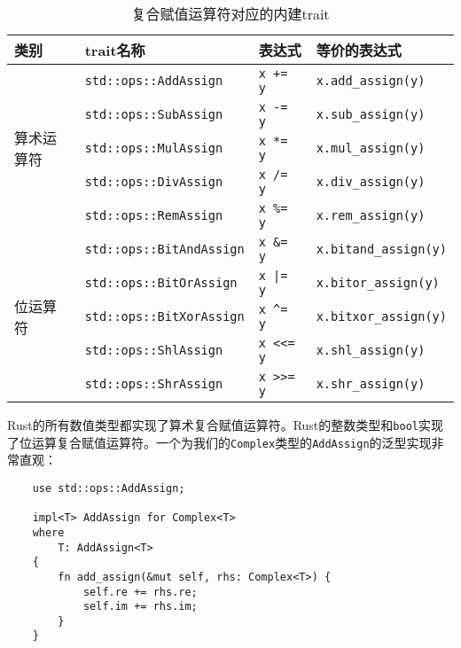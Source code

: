 \begin{table}[htbp]
    \centering
    \caption{复合赋值运算符对应的内建trait}
    \label{t12-4}
    \begin{tabular}{llll}
        \hline
        \textbf{类别}   & \textbf{trait名称}    & \textbf{表达式}   & \textbf{等价的表达式} \\
        \hline

        \multirow{5}{*}{算术运算符} & \texttt{std::ops::AddAssign}    & \texttt{x += y}    & \texttt{x.add\_assign(y)} \\
        & \texttt{std::ops::SubAssign} \cellcolor{tablecolor} & \texttt{x -= y} \cellcolor{tablecolor} & \texttt{x.sub\_assign(y)} \cellcolor{tablecolor}  \\
        & \texttt{std::ops::MulAssign}    & \texttt{x *= y}    & \texttt{x.mul\_assign(y)} \\
        & \texttt{std::ops::DivAssign} \cellcolor{tablecolor} & \texttt{x /= y} \cellcolor{tablecolor} & \texttt{x.div\_assign(y)} \cellcolor{tablecolor}  \\
        & \texttt{std::ops::RemAssign}    & \texttt{x \%= y}   & \texttt{x.rem\_assign(y)} \\

        \hline

        \multirow{5}{*}{位运算符}   & \texttt{std::ops::BitAndAssign} \cellcolor{tablecolor}  & \texttt{x \&= y} \cellcolor{tablecolor}    & \texttt{x.bitand\_assign(y)} \cellcolor{tablecolor}   \\
        & \texttt{std::ops::BitOrAssign}  & \texttt{x |= y}    & \texttt{x.bitor\_assign(y)}   \\
        & \texttt{std::ops::BitXorAssign} \cellcolor{tablecolor} & \texttt{x \^{}= y} \cellcolor{tablecolor}   & \texttt{x.bitxor\_assign(y)} \cellcolor{tablecolor}   \\
        & \texttt{std::ops::ShlAssign}    & \texttt{x <<= y}   & \texttt{x.shl\_assign(y)} \\
        & \texttt{std::ops::ShrAssign} \cellcolor{tablecolor} & \texttt{x >>= y} \cellcolor{tablecolor}    & \texttt{x.shr\_assign(y)} \cellcolor{tablecolor}  \\
    \end{tabular}
\end{table}

Rust的所有数值类型都实现了算术复合赋值运算符。Rust的整数类型和\texttt{bool}实现了位运算复合赋值运算符。一个为我们的\texttt{Complex}类型的\texttt{AddAssign}的泛型实现非常直观：
\begin{verbatim}
    use std::ops::AddAssign;

    impl<T> AddAssign for Complex<T>
    where
        T: AddAssign<T>
    {
        fn add_assign(&mut self, rhs: Complex<T>) {
            self.re += rhs.re;
            self.im += rhs.im;
        }
    }
\end{verbatim}

